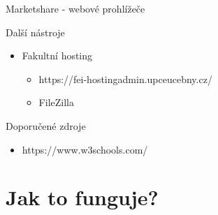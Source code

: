 \documentclass{beamer}
\begin{document}
\begin{frame}{Marketshare - webové prohlížeče}
\end{frame}

\begin{frame}{Další nástroje}

	\begin{itemize}
		\item Fakultní hosting
		\begin{itemize}
			\item https://fei-hostingadmin.upceucebny.cz/
			\item FileZilla
		\end{itemize}
	\end{itemize}

\end{frame}

\begin{frame}{Doporučené zdroje}
	\begin{itemize}
		\item https://www.w3schools.com/
	\end{itemize}
\end{frame}

\section{Jak to funguje?}
\end{document}
